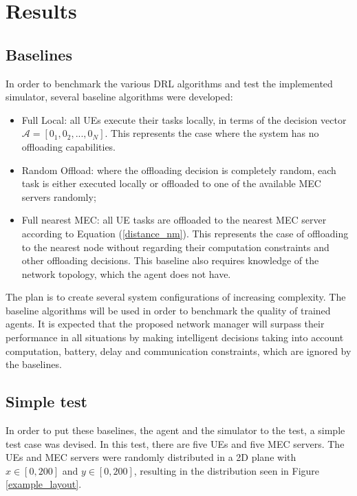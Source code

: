\chapter{Results}

\section{Baselines} \label{baselines}
\noindent In order to benchmark the various \acrshort{DRL} algorithms and test the implemented simulator, several baseline algorithms were developed:

\begin{itemize}
    \item Full Local: all \acrshort{UE}s execute their tasks locally, in terms of the decision vector $\mathcal{A}=[0_1, 0_2, ..., 0_N]$. This represents the case where the system has no offloading capabilities.
    \item Random Offload: where the offloading decision is completely random, each task is either executed locally or offloaded to one of the available \acrshort{MEC} servers randomly;
    \item Full nearest \acrshort{MEC}: all \acrshort{UE} tasks are offloaded to the nearest \acrshort{MEC} server according to Equation (\ref{distance_nm}). This represents the case of offloading to the nearest node without regarding their computation constraints and other offloading decisions. This baseline also requires knowledge of the network topology, which the agent does not have.
\end{itemize}

The plan is to create several system configurations of increasing complexity. The baseline algorithms will be used in order to benchmark the quality of trained agents. It is expected that the proposed network manager will surpass their performance in all situations by making intelligent decisions taking into account computation, battery, delay and communication constraints, which are ignored by the baselines.

\section{Simple test} \label{simple_test}

In order to put these baselines, the agent and the simulator to the test, a simple test case was devised. In this test, there are five \acrshort{UE}s and five \acrshort{MEC} servers. The UEs and MEC servers were randomly distributed in a 2D plane with $x \in [0, 200]$ and $y \in [0, 200]$, resulting in the distribution seen in Figure \ref{example_layout}.

